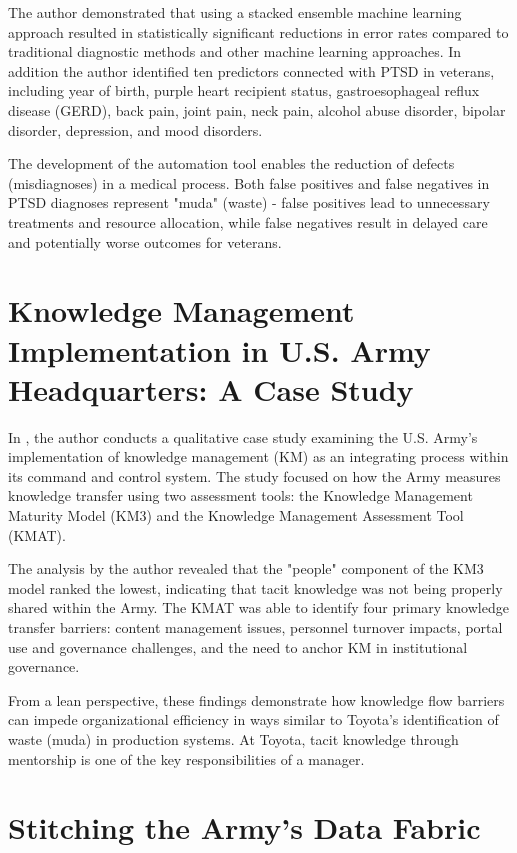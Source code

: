 \documentclass{article}
\begin{document}
			The author demonstrated that using a stacked ensemble machine learning approach resulted in statistically significant reductions in error rates compared to traditional diagnostic methods and other machine learning approaches. 
			In addition the author identified ten predictors connected with PTSD in veterans, including year of birth, purple heart recipient status, gastroesophageal reflux disease (GERD), back pain, joint pain, neck pain, alcohol abuse disorder, bipolar disorder, depression, and mood disorders. 

			The development of the automation tool enables the reduction of defects (misdiagnoses) in a medical process.
			Both false positives and false negatives in PTSD diagnoses represent "muda" (waste) - false positives lead to unnecessary treatments and resource allocation, while false negatives result in delayed care and potentially worse outcomes for veterans.


		\section{Knowledge Management Implementation in U.S. Army Headquarters: A Case Study \cite{VanLaar2023}}

			In \cite{VanLaar2023}, the author conducts a qualitative case study examining the U.S. Army's implementation of knowledge management (KM) as an integrating process within its command and control system. 
			The study focused on how the Army measures knowledge transfer using two assessment tools: the Knowledge Management Maturity Model (KM3) and the Knowledge Management Assessment Tool (KMAT). 

			The analysis by the author revealed that the "people" component of the KM3 model ranked the lowest, indicating that tacit knowledge was not being properly shared within the Army.
			The KMAT was able to identify four primary knowledge transfer barriers: content management issues, personnel turnover impacts, portal use and governance challenges, and the need to anchor KM in institutional governance.

			From a lean perspective, these findings demonstrate how knowledge flow barriers can impede organizational efficiency in ways similar to Toyota's identification of waste (muda) in production systems. 
			At Toyota, tacit knowledge through mentorship is one of the key responsibilities of a manager.


	\section{Stitching the Army's Data Fabric \cite{Patel2021}}
\end{document}

